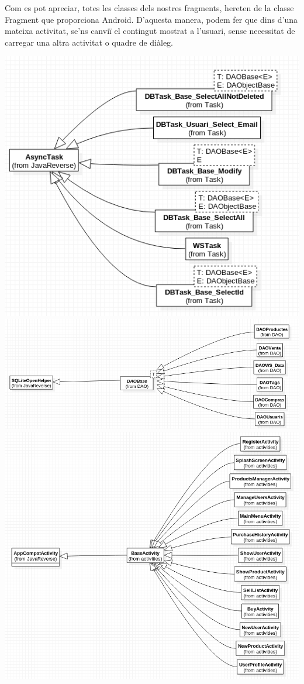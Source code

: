 \documentclass{article}
\begin{document}
	Com es pot apreciar, totes les classes dels nostres fragments, hereten de la classe Fragment que proporciona Android. D'aquesta manera, podem fer que dins d'una mateixa activitat, se'ns canviï el contingut mostrat a l'usuari, sense necessitat de carregar una altra activitat o quadre de diàleg.\\
\begin{center}
	\includegraphics[scale=0.5]{img/5.png}
	\includegraphics[scale=0.5]{img/6.png}
	\includegraphics[scale=0.5]{img/7.png}
\end{center}
\end{document}
